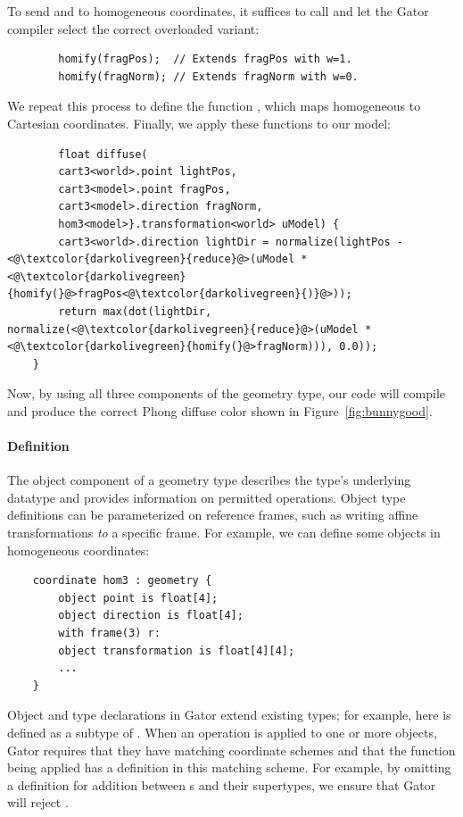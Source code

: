 \documentclass[../main.tex]{subfiles}
\begin{document}
	To send  and  to homogeneous coordinates, it suffices to call  and let the Gator compiler select the correct overloaded variant:
	\begin{lstlisting}
		homify(fragPos);  // Extends fragPos with w=1.
		homify(fragNorm); // Extends fragNorm with w=0.
	\end{lstlisting}  
	We repeat this process to define the function , which maps homogeneous to Cartesian coordinates.  Finally, we apply these functions to our model:
	\begin{lstlisting}
		float diffuse(
		cart3<world>.point lightPos, 
		cart3<model>.point fragPos, 
		cart3<model>.direction fragNorm,
		hom3<model>}.transformation<world> uModel) {
		cart3<world>.direction lightDir = normalize(lightPos - <@\textcolor{darkolivegreen}{reduce}@>(uModel * <@\textcolor{darkolivegreen}{homify(}@>fragPos<@\textcolor{darkolivegreen}{)}@>));
		return max(dot(lightDir, normalize(<@\textcolor{darkolivegreen}{reduce}@>(uModel * <@\textcolor{darkolivegreen}{homify(}@>fragNorm))), 0.0));
	}
\end{lstlisting}
%
Now, by using all three components of the geometry type, our code will compile and produce the correct Phong diffuse color shown in Figure~\ref{fig:bunnygood}.

\paragraph{Definition}
The object component of a geometry type describes the type's underlying datatype and provides information on permitted operations.  
Object type definitions can be parameterized on reference frames, such as writing affine transformations \textit{to} a specific frame.
For example, we can define some objects in homogeneous coordinates:
%
\begin{lstlisting}
	coordinate hom3 : geometry {
		object point is float[4];
		object direction is float[4];
		with frame(3) r:
		object transformation is float[4][4];
		...
	}
\end{lstlisting}
%
Object and type declarations in Gator extend existing types; for example, here  is defined as a subtype of .
When an operation is applied to one or more objects, Gator requires that they have matching coordinate schemes and that the function being applied has a definition in this matching scheme.
For example, by omitting a definition for addition between s and their supertypes, we ensure that Gator will reject  .
\end{document}
